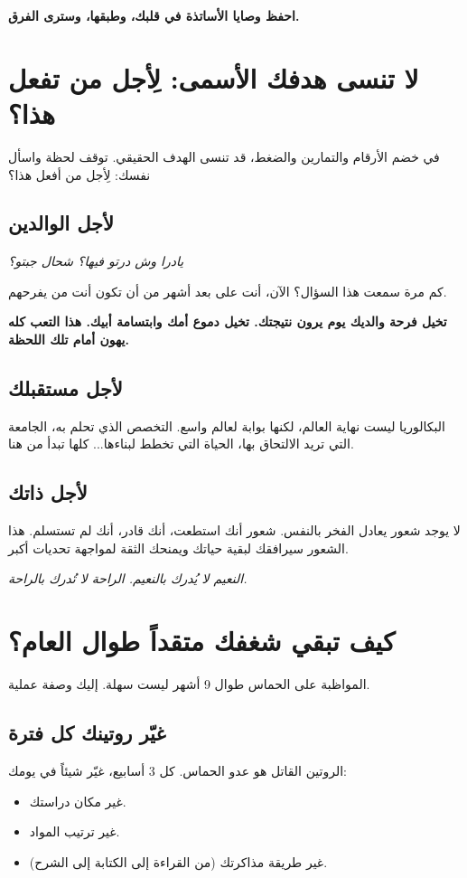 \documentclass[12pt,a4paper]{book}
\newcommand{\quoteAr}[1]{%
	\begin{myquote}
		\itshape #1
	\end{myquote}
}
\newcommand{\importantAr}[1]{%
	\begin{important}
		\bfseries #1
	\end{important}
}
\begin{document}
	\importantAr{احفظ وصايا الأساتذة في قلبك، وطبقها، وسترى الفرق.}
	
	\section{لا تنسى هدفك الأسمى: لِأجل من تفعل هذا؟}
	
	في خضم الأرقام والتمارين والضغط، قد تنسى الهدف الحقيقي. توقف لحظة واسأل نفسك: لِأجل من أفعل هذا؟
	
	\subsection{لأجل الوالدين}
	\quoteAr{يادرا وش درتو فيها؟ شحال جبتو؟}
	
	كم مرة سمعت هذا السؤال؟ الآن، أنت على بعد أشهر من أن تكون أنت من يفرحهم.
	\vspace{2.5cm}
	\importantAr{تخيل فرحة والديك يوم يرون نتيجتك. تخيل دموع أمك وابتسامة أبيك. هذا التعب كله يهون أمام تلك اللحظة.}
	
	\subsection{لأجل مستقبلك}
	البكالوريا ليست نهاية العالم، لكنها بوابة لعالم واسع. التخصص الذي تحلم به، الجامعة التي تريد الالتحاق بها، الحياة التي تخطط لبناءها... كلها تبدأ من هنا.
	
	\subsection{لأجل ذاتك}
	لا يوجد شعور يعادل الفخر بالنفس. شعور أنك استطعت، أنك قادر، أنك لم تستسلم. هذا الشعور سيرافقك لبقية حياتك ويمنحك الثقة لمواجهة تحديات أكبر.
	
	\quoteAr{النعيم لا يُدرك بالنعيم. الراحة لا تُدرك بالراحة.}
	
	\section{كيف تبقي شغفك متقداً طوال العام؟}
	
	المواظبة على الحماس طوال 9 أشهر ليست سهلة. إليك وصفة عملية.
	
	\subsection{غيّر روتينك كل فترة}
	الروتين القاتل هو عدو الحماس. كل 3 أسابيع، غيّر شيئاً في يومك:
	\begin{itemize}
		\item غير مكان دراستك.
		\item غير ترتيب المواد.
		\item غير طريقة مذاكرتك (من القراءة إلى الكتابة إلى الشرح).
	\end{itemize}
	
\end{document}
